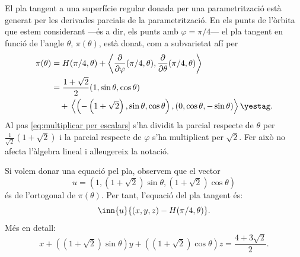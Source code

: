 \documentclass[12pt, a4paper]{article}
\begin{document}
El pla tangent a una superfície regular donada per una parametrització està generat per les derivades parcials de la parametrització. En els punts de l'òrbita que estem considerant ---és a dir, els punts amb \( \varphi = \pi/4 \)--- el pla tangent en funció de l'angle \( \theta \), \( \pi(\theta) \), està donat, com a subvarietat afí per
\begin{align*}
  \pi(\theta) &= H(\pi/4, \theta) + \left\langle \dfrac{\partial}{\partial \varphi}(\pi/4, \theta), \dfrac{\partial}{\partial \theta}(\pi/4, \theta) \right\rangle \\ 
							&= \dfrac{1+\sqrt{2}}{2} (1, \sin{\theta}, \cos{\theta}) \\
							& \quad +{} \left\langle \left(-\left(1+\sqrt{2}\right), \sin{\theta}, \cos{\theta}\right), (0, \cos{\theta}, -\sin{\theta}) \right\rangle \yestag \label{eq:multiplicar per escalars} .
\end{align*}
Al pas \ref{eq:multiplicar per escalars} s'ha dividit la parcial respecte de \( \theta \) per \( \frac{1}{\sqrt{2}}(1 + \sqrt{2}) \) i la parcial respecte de \( \varphi \) s'ha multiplicat per \( \sqrt{2} \). Fer això no afecta l'àlgebra lineal i alleugereix la notació.

Si volem donar una equació pel pla, observem que el vector \[ u = \left(1, \left(1+\sqrt{2}\right)\sin{\theta},  \left(1+\sqrt{2}\right)\cos{\theta}\right) \] és de l'ortogonal de \( \pi(\theta) \). Per tant, l'equació del pla tangent és:
\begin{equation*}
	\inn{u}{(x,y,z) - H(\pi/4, \theta)}.
\end{equation*}
Més en detall:
\begin{equation}
	x +\left(\left(1 + \sqrt{2}\right)\sin{\theta}\right)\! y +\left(\left(1 + \sqrt{2}\right)\cos{\theta}\right)\! z = \dfrac{4 + 3\sqrt{2}}{2}. 
\end{equation}
\end{document}
